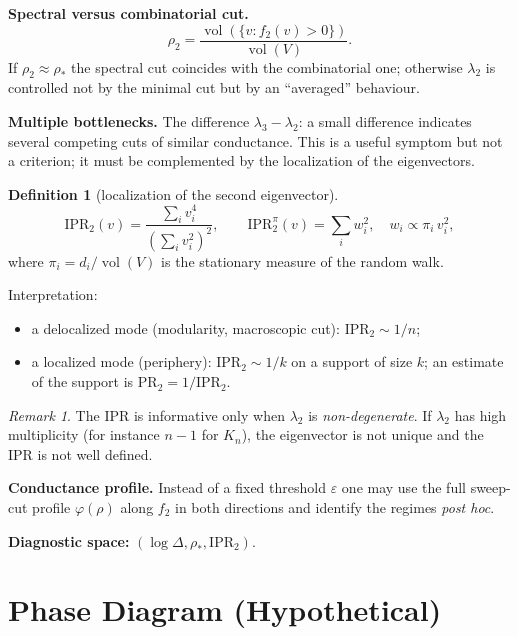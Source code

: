 \documentclass[11pt,a4paper]{article}
\theoremstyle{plain}
\theoremstyle{definition}
\newtheorem{definition}[theorem]{Definition}
\theoremstyle{remark}
\newtheorem{remark}[theorem]{Remark}
\DeclareMathOperator{\vol}{vol}
\newcommand{\Ph}{\varphi}
\newcommand{\lamtwo}{\lambda_2}
\newcommand{\lamthree}{\lambda_3}
\begin{document}
\textbf{Spectral versus combinatorial cut.}
\begin{equation}
\rho_2=\frac{\vol(\{v:f_2(v)>0\})}{\vol(V)} .
\end{equation}
If $\rho_2\approx\rho_*$ the spectral cut coincides with the combinatorial one;
otherwise $\lamtwo$ is controlled not by the minimal cut but by an ``averaged''
behaviour.

\textbf{Multiple bottlenecks.} The difference $\lamthree-\lamtwo$: a small
difference indicates several competing cuts of similar conductance. This is a
useful symptom but not a criterion; it must be complemented by the localization
of the eigenvectors.

\begin{definition}[localization of the second eigenvector]
\begin{equation}
\mathrm{IPR}_2(v)=\frac{\sum_i v_i^4}{\left(\sum_i v_i^2\right)^2},
\qquad
\mathrm{IPR}_2^{\pi}(v)=\sum_i w_i^2,\quad
w_i\propto\pi_i\,v_i^2,
\end{equation}
where $\pi_i=d_i/\vol(V)$ is the stationary measure of the random walk.
\end{definition}
Interpretation:
\begin{itemize}[leftmargin=*]
\item a delocalized mode (modularity, macroscopic cut): $\mathrm{IPR}_2\sim 1/n$;
\item a localized mode (periphery): $\mathrm{IPR}_2\sim 1/k$ on a support of
size $k$; an estimate of the support is $\mathrm{PR}_2=1/\mathrm{IPR}_2$.
\end{itemize}
\begin{remark}
The IPR is informative only when $\lamtwo$ is \emph{non-degenerate}. If
$\lamtwo$ has high multiplicity (for instance $n-1$ for $K_n$), the eigenvector
is not unique and the IPR is not well defined.
\end{remark}

\textbf{Conductance profile.} Instead of a fixed threshold $\varepsilon$ one may
use the full sweep-cut profile $\Ph(\rho)$ along $f_2$ in both directions and
identify the regimes \emph{post hoc}.

\textbf{Diagnostic space:} $(\log\Delta,\rho_*,\mathrm{IPR}_2)$.

\section{Phase Diagram (Hypothetical)}
\label{sec:phase}
\end{document}
